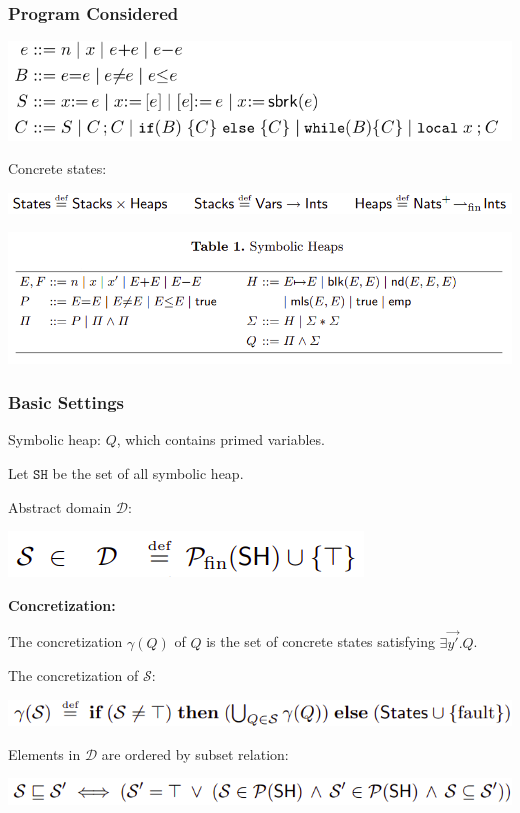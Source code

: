 \documentclass[aspectratio=1610, 13pt]{beamer}
\begin{document}
\begin{frame}\frametitle{Program Considered}
\begin{center}
\includegraphics[scale=0.45]{program_considered.png}
\end{center}
Concrete states:

\includegraphics[scale=0.45]{states.png}


\includegraphics[scale=0.45]{sh.png}

\end{frame}

\begin{frame}\frametitle{Basic Settings}
Symbolic heap: $Q$, which contains primed variables.

Let $\mathtt{SH}$ be the set of all symbolic heap.

Abstract domain $\mathcal{D}$:

\includegraphics[scale=0.40]{abstractdomain.png}

\textbf{Concretization: }

The concretization $\gamma(Q)$ of $Q$ is the set of concrete states satisfying $\exists \vec{y'}. Q$.

The concretization of $\mathcal{S}$:
\begin{center}
\includegraphics[scale=0.4]{concretization.png}
\end{center}

Elements in $\mathcal{D}$ are ordered by subset relation:
\begin{center}
\includegraphics[scale=0.4]{order.png}
\end{center}



\end{frame}
\end{document}
